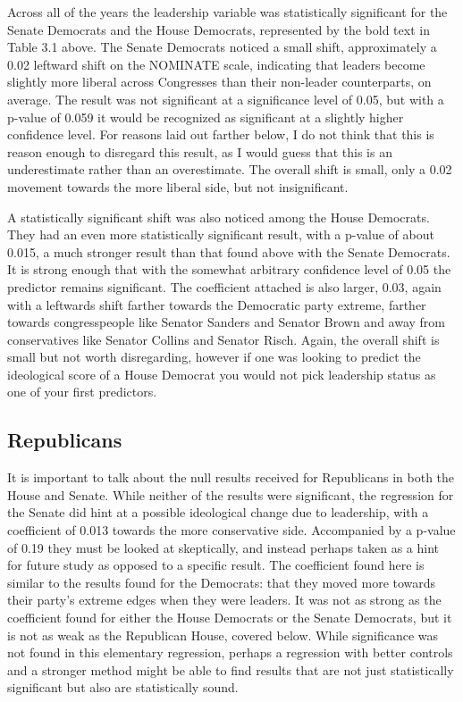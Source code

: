 \documentclass[12pt,twoside]{reedthesis}
\begin{document}
  Across all of the years the leadership variable was statistically
  significant for the Senate Democrats and the House Democrats,
  represented by the bold text in Table 3.1 above. The Senate Democrats
  noticed a small shift, approximately a 0.02 leftward shift on the
  NOMINATE scale, indicating that leaders become slightly more liberal
  across Congresses than their non-leader counterparts, on average. The
  result was not significant at a significance level of 0.05, but with a
  p-value of 0.059 it would be recognized as significant at a slightly
  higher confidence level. For reasons laid out farther below, I do not
  think that this is reason enough to disregard this result, as I would
  guess that this is an underestimate rather than an overestimate. The
  overall shift is small, only a 0.02 movement towards the more liberal
  side, but not insignificant.
  
  A statistically significant shift was also noticed among the House
  Democrats. They had an even more statistically significant result, with
  a p-value of about 0.015, a much stronger result than that found above
  with the Senate Democrats. It is strong enough that with the somewhat
  arbitrary confidence level of 0.05 the predictor remains significant.
  The coefficient attached is also larger, 0.03, again with a leftwards
  shift farther towards the Democratic party extreme, farther towards
  congresspeople like Senator Sanders and Senator Brown and away from
  conservatives like Senator Collins and Senator Risch. Again, the overall
  shift is small but not worth disregarding, however if one was looking to
  predict the ideological score of a House Democrat you would not pick
  leadership status as one of your first predictors.
  
  \subsection{Republicans}\label{republicans}
  
  It is important to talk about the null results received for Republicans
  in both the House and Senate. While neither of the results were
  significant, the regression for the Senate did hint at a possible
  ideological change due to leadership, with a coefficient of 0.013
  towards the more conservative side. Accompanied by a p-value of 0.19
  they must be looked at skeptically, and instead perhaps taken as a hint
  for future study as opposed to a specific result. The coefficient found
  here is similar to the results found for the Democrats: that they moved
  more towards their party's extreme edges when they were leaders. It was
  not as strong as the coefficient found for either the House Democrats or
  the Senate Democrats, but it is not as weak as the Republican House,
  covered below. While significance was not found in this elementary
  regression, perhaps a regression with better controls and a stronger
  method might be able to find results that are not just statistically
  significant but also are statistically sound.
  
\end{document}
